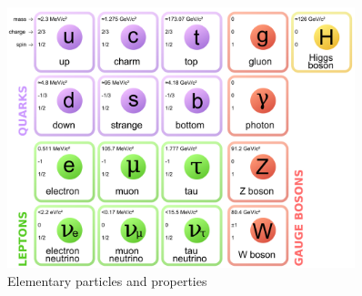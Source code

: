 \begin{figure}[!h]                
	\includegraphics[width=0.9\textwidth]{Chapter1/elementary_particle.png}
	\centering
	\begin{center}
		\caption{Elementary particles and properties}
		\label{Fig:elementary_particle}            
	\end{center}
\end{figure}

